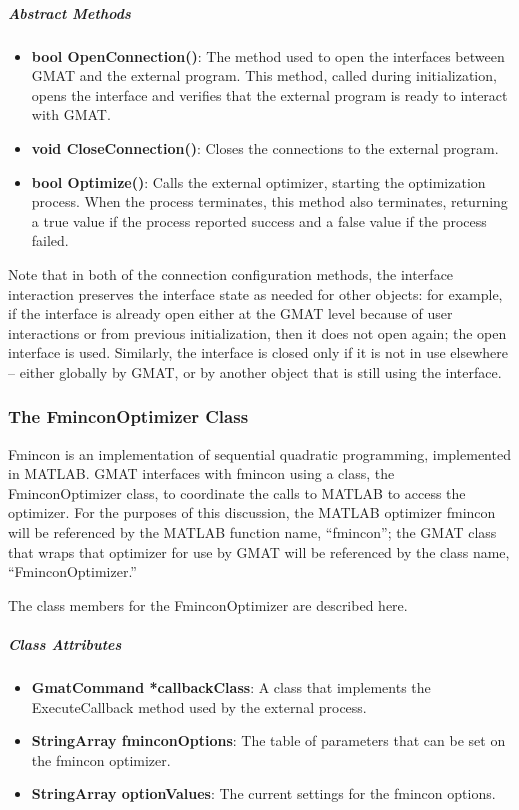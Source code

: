 \subparagraph{\textit{Abstract Methods}}
\begin{itemize}
\item \textbf{bool OpenConnection()}: The method used to open the interfaces between GMAT and the
external program.  This method, called during initialization, opens the interface and verifies that
the external program is ready to interact with GMAT.
\item \textbf{void CloseConnection()}: Closes the connections to the external program.
\item \textbf{bool Optimize()}: Calls the external optimizer, starting the optimization process.
When the process terminates, this method also terminates, returning a true value if the process
reported success and a false value if the process failed.
\end{itemize}

Note that in both of the connection configuration methods, the interface interaction preserves the
interface state as needed for other objects: for example, if the interface is already open either at
the GMAT level because of user interactions or from previous initialization, then it does not open
again; the open interface is used.  Similarly, the interface is closed only if it is not in use
elsewhere -- either globally by GMAT, or by another object that is still using the interface.

\subsubsection{The FminconOptimizer Class}

Fmincon is an implementation of sequential quadratic programming, implemented in MATLAB.  GMAT
interfaces with fmincon using a class, the FminconOptimizer class, to coordinate the calls to
MATLAB to access the optimizer.  For the purposes of this discussion, the MATLAB optimizer fmincon
will be referenced by the MATLAB function name, ``fmincon''; the GMAT class that wraps that
optimizer for use by GMAT will be referenced by the class name, ``FminconOptimizer.''

The class members for the FminconOptimizer are described here.

\subparagraph{\textit{Class Attributes}}
\begin{itemize}
\item \textbf{GmatCommand *callbackClass}: A class that implements the ExecuteCallback method used
by the external process.
\item \textbf{StringArray fminconOptions}: The table of parameters that can be set on the fmincon
optimizer.
\item \textbf{StringArray optionValues}:  The current settings for the fmincon options.
\end{itemize}

